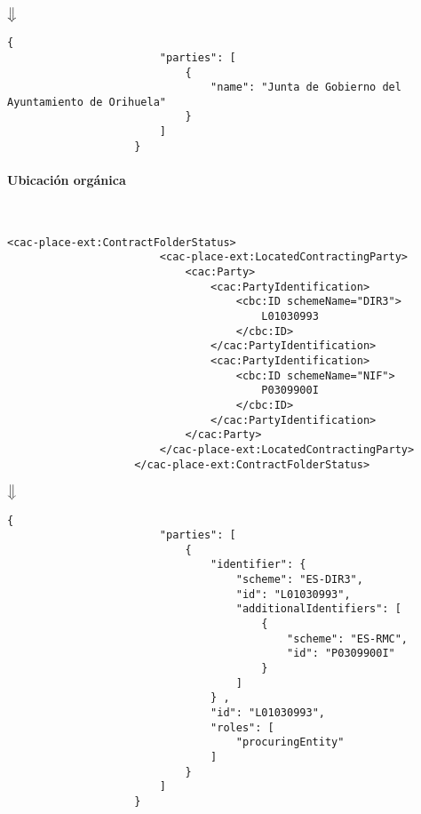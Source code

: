                 \begin{center}
                    $\big\Downarrow$
                \end{center}
                
                \begin{lstlisting}[language=lJSON]
                    {
                        "parties": [
                            {
                                "name": "Junta de Gobierno del Ayuntamiento de Orihuela"
                            }
                        ]
                    }
                \end{lstlisting}
                
            \paragraph{Ubicación orgánica} \mbox{}\\
                \begin{lstlisting}[language=lXML]
                    <cac-place-ext:ContractFolderStatus>
                        <cac-place-ext:LocatedContractingParty>
                            <cac:Party>
                                <cac:PartyIdentification>
                                    <cbc:ID schemeName="DIR3">
                                        L01030993
                                    </cbc:ID>
                                </cac:PartyIdentification>
                                <cac:PartyIdentification>
                                    <cbc:ID schemeName="NIF">
                                        P0309900I
                                    </cbc:ID>
                                </cac:PartyIdentification>
                            </cac:Party>
                        </cac-place-ext:LocatedContractingParty>
                    </cac-place-ext:ContractFolderStatus>
                \end{lstlisting}
                
                \begin{center}
                    $\big\Downarrow$
                \end{center}
                
                \begin{lstlisting}[language=lJSON]
                    {
                        "parties": [
                            {
                                "identifier": {
                                    "scheme": "ES-DIR3",
                                    "id": "L01030993",
                                    "additionalIdentifiers": [
                                        {
                                            "scheme": "ES-RMC",
                                            "id": "P0309900I"
                                        }
                                    ]
                                } ,
                                "id": "L01030993",
                                "roles": [
                                    "procuringEntity"
                                ]
                            }
                        ]
                    }
                \end{lstlisting}
                
